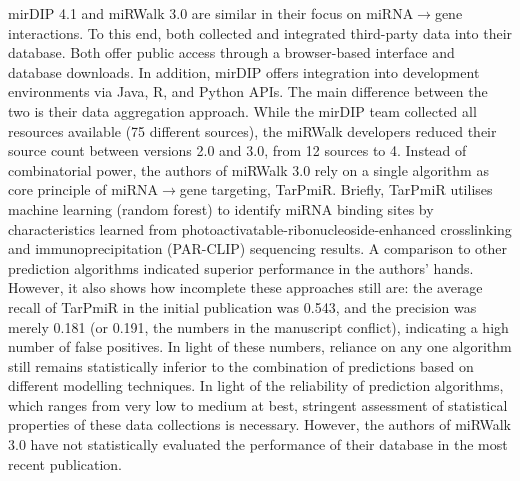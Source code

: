 mirDIP 4.1\cite{Tokar2018} and miRWalk 3.0\cite{Sticht2018} are similar in their focus on miRNA$\to$gene interactions. To this end, both collected and integrated third-party data into their database. Both offer public access through a browser-based interface and database downloads. In addition, mirDIP offers integration into development environments via Java, R, and Python APIs. The main difference between the two is their data aggregation approach. While the mirDIP team collected all resources available (75 different sources\cite{Tokar2018}), the miRWalk developers reduced their source count between versions 2.0 and 3.0, from 12 sources to 4.\cite{Sticht2018} Instead of combinatorial power, the authors of miRWalk 3.0 rely on a single algorithm as core principle of miRNA$\to$gene targeting, TarPmiR.\cite{Ding2016} Briefly, TarPmiR utilises machine learning (random forest) to identify miRNA binding sites by characteristics learned from photoactivatable-ribonucleoside-enhanced crosslinking and immunoprecipitation (PAR-CLIP) sequencing results. A comparison to other prediction algorithms indicated superior performance in the authors' hands.\cite{Ding2016} However, it also shows how incomplete these approaches still are: the average recall of TarPmiR in the initial publication was 0.543, and the precision was merely 0.181 (or 0.191, the numbers in the manuscript conflict), indicating a high number of false positives. In light of these numbers, reliance on any one algorithm still remains statistically inferior to the combination of predictions based on different modelling techniques.\cite{Witkos2011} In light of the reliability of prediction algorithms, which ranges from very low to medium at best, stringent assessment of statistical properties of these data collections is necessary. However, the authors of miRWalk 3.0 have not statistically evaluated the performance of their database in the most recent publication.\cite{Sticht2018}

